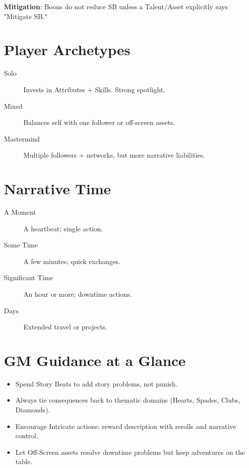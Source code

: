 \textbf{Mitigation}: Boons do not reduce SB unless a Talent/Asset explicitly says "Mitigate SB."

\section{Player Archetypes}

\begin{description}
\item[Solo] Invests in Attributes + Skills. Strong spotlight.
\item[Mixed] Balances self with one follower or off-screen assets.
\item[Mastermind] Multiple followers + networks, but more narrative liabilities.
\end{description}

\section{Narrative Time}

\begin{description}
\item[A Moment] A heartbeat; single action.
\item[Some Time] A few minutes; quick exchanges.
\item[Significant Time] An hour or more; downtime actions.
\item[Days] Extended travel or projects.
\end{description}

\section{GM Guidance at a Glance}

\begin{itemize}
\item Spend Story Beats to add story problems, not punish.
\item Always tie consequences back to thematic domains (Hearts, Spades, Clubs, Diamonds).
\item Encourage Intricate actions: reward description with rerolls and narrative control.
\item Let Off-Screen assets resolve downtime problems but keep adventures on the table.
\end{itemize}

